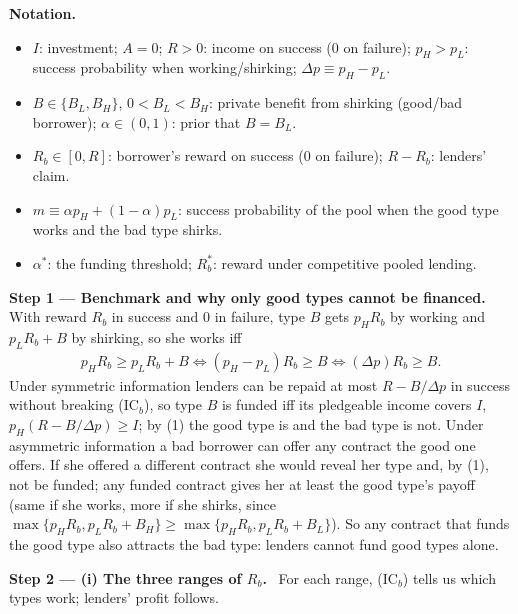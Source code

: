 \documentclass[11pt,a4paper]{article}
\newcommand{\notation}{\par\noindent\textbf{Notation.}}
\newcommand{\step}[2]{\par\medskip\noindent\textbf{Step #1 --- #2.}~}
\begin{document}
\notation
\begin{itemize}
  \item $I$: investment; $A=0$; $R>0$: income on success (0 on failure); $p_H>p_L$: success probability when working/shirking; $\Delta p\equiv p_H-p_L$.
  \item $B\in\{B_L,B_H\}$, $0<B_L<B_H$: private benefit from shirking (good/bad borrower); $\alpha\in(0,1)$: prior that $B=B_L$.
  \item $R_b\in[0,R]$: borrower's reward on success (0 on failure); $R-R_b$: lenders' claim.
  \item $m\equiv\alpha p_H+(1-\alpha)p_L$: success probability of the pool when the good type works and the bad type shirks.
  \item $\alpha^*$: the funding threshold; $R_b^*$: reward under competitive pooled lending.
\end{itemize}

\step{1}{Benchmark and why only good types cannot be financed} With reward $R_b$ in success and 0 in failure, type $B$ gets $p_HR_b$ by working and $p_LR_b+B$ by shirking, so she works iff
\begin{align}
  p_HR_b \ge p_LR_b+B \iff (p_H-p_L)R_b\ge B \iff (\Delta p)R_b\ge B. \tag{IC$_b$}
\end{align}
Under symmetric information lenders can be repaid at most $R-B/\Delta p$ in success without breaking (IC$_b$), so type $B$ is funded iff its pledgeable income covers $I$, $p_H(R-B/\Delta p)\ge I$; by (1) the good type is and the bad type is not. Under asymmetric information a bad borrower can offer any contract the good one offers. If she offered a different contract she would reveal her type and, by (1), not be funded; any funded contract gives her at least the good type's payoff (same if she works, more if she shirks, since $\max\{p_HR_b,p_LR_b+B_H\}\ge\max\{p_HR_b,p_LR_b+B_L\}$). So any contract that funds the good type also attracts the bad type: lenders cannot fund good types alone.

\step{2}{(i) The three ranges of $R_b$} For each range, (IC$_b$) tells us which types work; lenders' profit follows.
\end{document}
